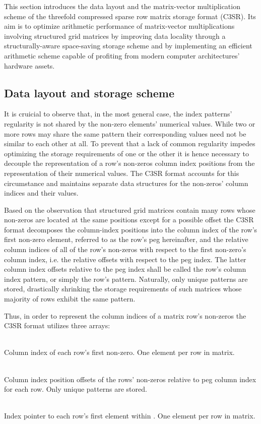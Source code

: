 \documentclass{article}
\begin{document}
  This section introduces the data layout and the matrix-vector multiplication scheme of the threefold compressed sparse row matrix storage format (C3SR). Its aim is to optimize arithmetic performance of matrix-vector multiplications involving structured grid matrices by improving data locality through a structurally-aware space-saving storage scheme and by implementing an efficient arithmetic scheme capable of profiting from modern computer architectures' hardware assets.

  \subsection{Data layout and storage scheme}

    It is cruicial to observe that, in the most general case, the index patterns' regularity is not shared by the non-zero elements' numerical values. While two or more rows may share the same pattern their corresponding values need not be similar to each other at all. To prevent that a lack of common regularity impedes optimizing the storage requirements of one or the other it is hence necessary to decouple the representation of a row's non-zeros column index positions from the representation of their numerical values. The C3SR format accounts for this circumstance and maintains separate data structures for the non-zeros' column indices and their values.

    Based on the observation that structured grid matrices contain many rows whose non-zeros are located at the same positions except for a possible offset the C3SR format decomposes the column-index positions into the column index of the row's first non-zero element, referred to as the row's peg hereinafter, and the relative column indices of all of the row's non-zeros with respect to the first non-zero's column index, i.e. the relative offsets with respect to the peg index. The latter column index offsets relative to the peg index shall be called the row's column index pattern, or simply the row's pattern. Naturally, only unique patterns are stored, drastically shrinking the storage requirements of such matrices whose majority of rows exhibit the same pattern.

    Thus, in order to represent the column indices of a matrix row's non-zeros the C3SR format utilizes three arrays:

    \begin{description}[align = left, labelwidth = 4cm]
      \item [JP - \emph{Peg column index}] \hfill \\
        Column index of each row's first non-zero. One element per row in matrix.
      \item [J - \emph{Column index patterns}] \hfill \\
        Column index position offsets of the rows' non-zeros relative to peg column index for each row. Only unique patterns are stored.
      \item [JS - \emph{Pattern index pointer}] \hfill \\
        Index pointer to each row's first element within \J. One element per row in matrix.
    \end{description}
\end{document}
